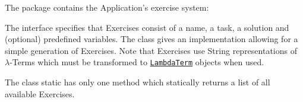 The \texttt{} package contains the Application's exercise system:

The \texttt{} interface specifies that Exercises consist of a name, a task, a solution and (optional) predefined variables.
The \texttt{} class gives an implementation allowing for a simple generation of Exercises.
Note that Exercises use String representations of $\lambda$-Terms which must be transformed to \texttt{\hyperref[type:edu.kit.wavelength.client.model.term.LambdaTerm]{LambdaTerm}} objects when used.

The \texttt{} class static has only one method which statically returns a list of all available Exercises.


